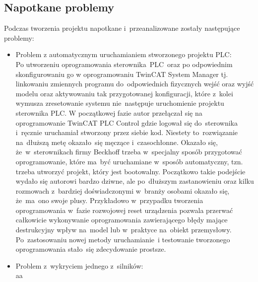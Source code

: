 \subsection{Napotkane problemy}
Podczas tworzenia projektu napotkane i~przeanalizowane zostały następujące problemy:
\begin{itemize}
\item Problem z automatycznym uruchamianiem stworzonego projektu PLC:\\[1mm]
Po utworzeniu oprogramowania sterownika~PLC~oraz po odpowiednim skonfigurowaniu go w oprogramowaniu TwinCAT System Manager tj. linkowaniu zmiennych programu do~odpowiednich fizycznych wejść oraz wyjść modelu oraz aktywowaniu tak przygotowanej konfiguracji, które z~kolei wymusza zresetowanie systemu nie~następuje uruchomienie projektu sterownika PLC. W początkowej fazie autor przełączał się na oprogramowanie TwinCAT PLC Control gdzie logował się do~sterownika i~ręcznie uruchamiał stworzony przez siebie kod. Niestety to~rozwiązanie na~dłuższą metę okazało~się męczące i~czasochłonne. Okazało się, że~w~sterownikach firmy Beckhoff trzeba w~specjalny sposób przygotować oprogramowanie, które ma~być uruchamiane w~sposób automatyczny, tzn. trzeba utworzyć projekt, który jest bootowalny. Początkowo takie podejście wydało się autorowi bardzo dziwne, ale po~dłuższym zastanowieniu oraz kilku rozmowach z~bardziej doświadczonymi w~branży osobami okazało się, że~ma~ono swoje plusy. Przykładowo w~przypadku tworzenia oprogramowania w~fazie rozwojowej reset urządzenia pozwala przerwać całkowicie wykonywanie oprogramowania zawierającego błędy mające destrukcyjny wpływ na~model lub w~praktyce na~obiekt przemysłowy. Po~zastosowaniu nowej metody uruchamianie~i testowanie tworzonego oprogramowania stało~się zdecydowanie prostsze.

\item Problem z~wykryciem jednego z~silników:\\[1mm]
aa


\end{itemize}
